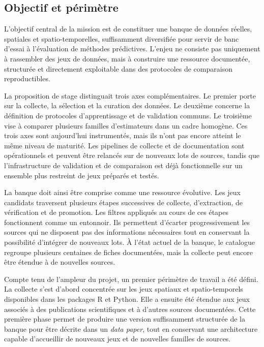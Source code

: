 \documentclass[11pt,a4paper]{article}
\begin{document}
\subsection{Objectif et périmètre}

L'objectif central de la mission est de constituer une banque de données réelles, spatiales et spatio-temporelles, suffisamment diversifiée pour servir de banc d'essai à l'évaluation de méthodes prédictives. L'enjeu ne consiste pas uniquement à rassembler des jeux de données, mais à construire une ressource documentée, structurée et directement exploitable dans des protocoles de comparaison reproductibles.

La proposition de stage distinguait trois axes complémentaires. Le premier porte sur la collecte, la sélection et la curation des données. Le deuxième concerne la définition de protocoles d'apprentissage et de validation communs. Le troisième vise à comparer plusieurs familles d'estimateurs dans un cadre homogène. Ces trois axes sont aujourd'hui instrumentés, mais ils n'ont pas encore atteint le même niveau de maturité. Les pipelines de collecte et de documentation sont opérationnels et peuvent être relancés sur de nouveaux lots de sources, tandis que l'infrastructure de validation et de comparaison est déjà fonctionnelle sur un ensemble plus restreint de jeux préparés et testés.

La banque doit ainsi être comprise comme une ressource évolutive. Les jeux candidats traversent plusieurs étapes successives de collecte, d'extraction, de vérification et de promotion. Les filtres appliqués au cours de ces étapes fonctionnent comme un entonnoir. Ils permettent d'écarter progressivement les sources qui ne disposent pas des informations nécessaires tout en conservant la possibilité d'intégrer de nouveaux lots. À l'état actuel de la banque, le catalogue regroupe plusieurs centaines de fiches documentées, mais la collecte peut encore être étendue à de nouvelles sources.

Compte tenu de l'ampleur du projet, un premier périmètre de travail a été défini. La collecte s'est d'abord concentrée sur les jeux spatiaux et spatio-temporels disponibles dans les packages R et Python. Elle a ensuite été étendue aux jeux associés à des publications scientifiques et à d'autres sources documentées. Cette première phase permet de produire une version suffisamment structurée de la banque pour être décrite dans un \textit{data paper}, tout en conservant une architecture capable d'accueillir de nouveaux jeux et de nouvelles familles de sources.
\end{document}
